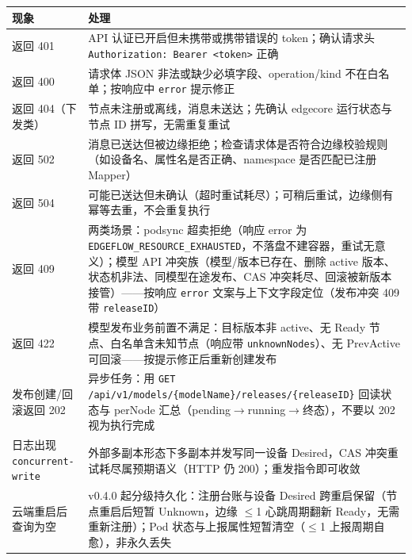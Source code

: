 \begin{tabularx}{\textwidth}{l X}
  \toprule
  \textbf{现象} & \textbf{处理} \\
  \midrule
  返回 401 & API 认证已开启但未携带或携带错误的 token；确认请求头 \texttt{Authorization: Bearer <token>} 正确 \\
  返回 400 & 请求体 JSON 非法或缺少必填字段、operation/kind 不在白名单；按响应中 \texttt{error} 提示修正 \\
  返回 404（下发类） & 节点未注册或离线，消息未送达；先确认 edgecore 运行状态与节点 ID 拼写，无需重复重试 \\
  返回 502 & 消息已送达但被边缘拒绝；检查请求体是否符合边缘校验规则（如设备名、属性名是否正确、namespace 是否匹配已注册 Mapper） \\
  返回 504 & 可能已送达但未确认（超时重试耗尽）；可稍后重试，边缘侧有幂等去重，不会重复执行 \\
  返回 409 & 两类场景：podsync 超卖拒绝（响应 error 为 \texttt{EDGEFLOW\_RESOURCE\_EXHAUSTED}，不落盘不建容器，重试无意义）；模型 API 冲突族（模型/版本已存在、删除 active 版本、状态机非法、同模型在途发布、CAS 冲突耗尽、回滚被新版本接管）——按响应 \texttt{error} 文案与上下文字段定位（发布冲突 409 带 \texttt{releaseID}） \\
  返回 422 & 模型发布业务前置不满足：目标版本非 active、无 Ready 节点、白名单含未知节点（响应带 \texttt{unknownNodes}）、无 PrevActive 可回滚——按提示修正后重新创建发布 \\
  发布创建/回滚返回 202 & 异步任务：用 \texttt{GET /api/v1/models/\{modelName\}/releases/\{releaseID\}} 回读状态与 perNode 汇总（pending$\rightarrow$running$\rightarrow$终态），不要以 202 视为执行完成 \\
  日志出现 \texttt{concurrent-write} & 外部多副本形态下多副本并发写同一设备 Desired，CAS 冲突重试耗尽属预期语义（HTTP 仍 200）；重发指令即可收敛 \\
  云端重启后查询为空 & v0.4.0 起分级持久化：注册台账与设备 Desired 跨重启保留（节点重启后短暂 Unknown，边缘 $\leq$1 心跳周期翻新 Ready，无需重新注册）；Pod 状态与上报属性短暂清空（$\leq$1 上报周期自愈），非永久丢失 \\
  \bottomrule
\end{tabularx}
